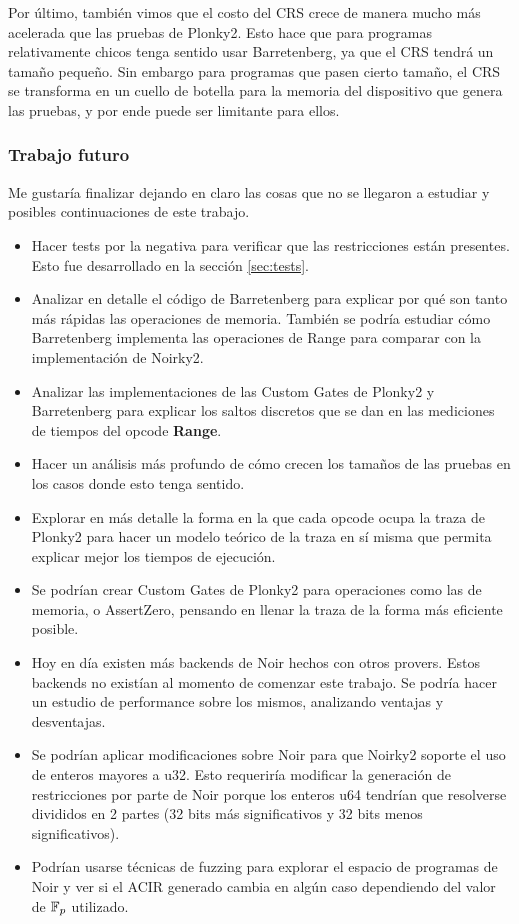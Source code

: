 \documentclass[11pt,a4paper]{tesis}
\begin{document}
Por último, también vimos que el costo del CRS crece de manera mucho más acelerada que las pruebas de Plonky2. Esto hace que para programas relativamente chicos tenga sentido usar Barretenberg, ya que el CRS tendrá un tamaño pequeño. Sin embargo para programas que pasen cierto tamaño, el CRS se transforma en un cuello de botella para la memoria del dispositivo que genera las pruebas, y por ende puede ser limitante para ellos. 

\subsubsection{Trabajo futuro}

Me gustaría finalizar dejando en claro las cosas que no se llegaron a estudiar y posibles continuaciones de este trabajo. 

\begin{itemize}
	\item Hacer tests por la negativa para verificar que las restricciones están presentes. Esto fue desarrollado en la sección \ref{sec:tests}.
	\item Analizar en detalle el código de Barretenberg para explicar por qué son tanto más rápidas las operaciones de memoria. También se podría estudiar cómo Barretenberg implementa las operaciones de Range para comparar con la implementación de Noirky2. 
	\item Analizar las implementaciones de las Custom Gates de Plonky2 y Barretenberg para explicar los saltos discretos que se dan en las mediciones de tiempos del opcode \textbf{Range}.
	\item Hacer un análisis más profundo de cómo crecen los tamaños de las pruebas en los casos donde esto tenga sentido.
	\item Explorar en más detalle la forma en la que cada opcode ocupa la traza de Plonky2 para hacer un modelo teórico de la traza en sí misma que permita explicar mejor los tiempos de ejecución. 
	\item Se podrían crear Custom Gates de Plonky2 para operaciones como las de memoria, o AssertZero, pensando en llenar la traza de la forma más eficiente posible. 
	\item Hoy en día existen más backends de Noir hechos con otros provers. Estos backends no existían al momento de comenzar este trabajo. Se podría hacer un estudio de performance sobre los mismos, analizando ventajas y desventajas. 
	\item Se podrían aplicar modificaciones sobre Noir para que Noirky2 soporte el uso de enteros mayores a u32. Esto requeriría modificar la generación de restricciones por parte de Noir porque los enteros u64 tendrían que resolverse divididos en 2 partes (32 bits más significativos y 32 bits menos significativos).
	\item Podrían usarse técnicas de fuzzing para explorar el espacio de programas de Noir y ver si el ACIR generado cambia en algún caso dependiendo del valor de $\mathbb{F}_p$ utilizado.
	
	
\end{itemize}
\end{document}
